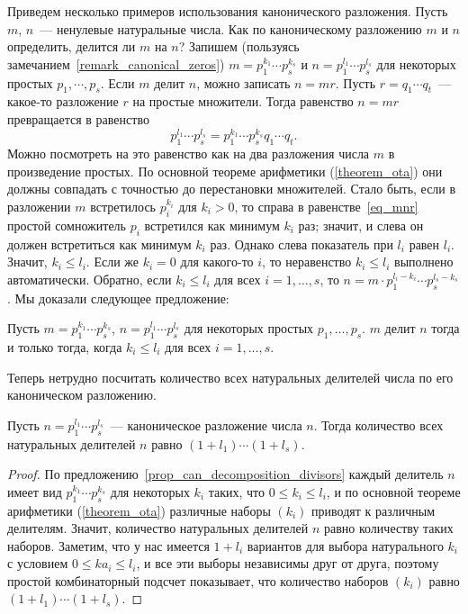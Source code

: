 Приведем несколько примеров использования канонического
разложения. Пусть $m$, $n$~--- ненулевые натуральные числа. Как по
каноническому разложению $m$ и $n$ определить, делится ли $m$ на $n$?
Запишем (пользуясь замечанием~\ref{remark_canonical_zeros})
$m=p_1^{k_1}\cdots p_s^{k_s}$ и $n=p_1^{l_1}\cdots p_s^{l_s}$ для
некоторых простых $p_1,\cdots,p_s$. Если $m$ делит $n$, можно
записать $n=mr$. Пусть $r=q_1\cdots q_t$~--- какое-то разложение $r$
на простые множители. Тогда равенство $n=mr$ превращается в равенство
\begin{equation}
p_1^{l_1}\cdots p_s^{l_s} = p_1^{k_1}\cdots p_s^{k_s}q_1\cdots q_t.\label{eq_mnr}
\end{equation}
Можно посмотреть на это равенство как на два разложения числа $m$ в
произведение простых. По основной теореме арифметики
(\ref{theorem_ota}) они должны совпадать с точностью до перестановки
множителей. Стало быть, если в разложении $m$ встретилось $p_i^{k_i}$
для $k_i>0$, то справа в равенстве~\ref{eq_mnr} простой сомножитель
$p_i$ встретился как минимум $k_i$ раз; значит, и слева он должен
встретиться как минимум $k_i$ раз. Однако слева показатель при $l_i$
равен $l_i$. Значит, $k_i\leq l_i$. Если же $k_i=0$ для какого-то $i$,
то неравенство $k_i\leq l_i$ выполнено автоматически.
Обратно, если $k_i\leq l_i$ для всех $i=1,\dots,s$, то
$n = m\cdot p_1^{l_i-k_i}\cdots p_s^{l_s-k_s}$.
Мы доказали следующее предложение:

\begin{proposition}\label{prop_can_decomposition_divisors}
Пусть $m=p_1^{k_1}\cdots p_s^{k_s}$, $n=p_1^{l_1}\cdots p_s^{l_s}$ для
некоторых простых $p_1,\dots,p_s$.
$m$ делит $n$ тогда и только тогда, когда
$k_i\leq l_i$ для всех $i=1,\dots,s$.
\end{proposition}

Теперь нетрудно посчитать количество всех натуральных делителей числа по
его каноническом разложению.
\begin{proposition}
Пусть $n=p_1^{l_1}\cdots p_s^{l_s}$~--- каноническое разложение числа
$n$. Тогда количество всех натуральных делителей $n$ равно
$(1+l_1)\cdots(1+l_s)$.
\end{proposition}
\begin{proof}
По предложению~\ref{prop_can_decomposition_divisors} каждый делитель
$n$ имеет вид $p_1^{k_1}\cdots p_s^{k_s}$ для некоторых $k_i$ таких,
что $0\leq k_i\leq l_i$, и по основной теореме арифметики
(\ref{theorem_ota}) различные наборы $(k_i)$ приводят к различным
делителям. Значит, количество натуральных делителей $n$ равно
количеству таких наборов. Заметим, что у нас имеется $1+l_i$ вариантов
для выбора натурального $k_i$ с условием $0\leq ka_i\leq l_i$, и все
эти выборы независимы друг от друга, поэтому 
простой комбинаторный подсчет показывает, что количество наборов
$(k_i)$ равно $(1+l_1)\cdots (1+l_s)$.
\end{proof}

